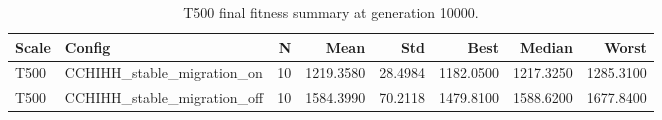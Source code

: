 \begin{table}[htbp]
\centering
\caption{T500 final fitness summary at generation 10000.}
\label{tab:t500_final_fitness_summary}
\begin{tabular}{llrrrrrr}
\toprule
Scale & Config & N & Mean & Std & Best & Median & Worst \\
\midrule
T500 & CCHIHH_stable_migration_on & 10 & 1219.3580 & 28.4984 & 1182.0500 & 1217.3250 & 1285.3100 \\
T500 & CCHIHH_stable_migration_off & 10 & 1584.3990 & 70.2118 & 1479.8100 & 1588.6200 & 1677.8400 \\
\bottomrule
\end{tabular}
\end{table}
